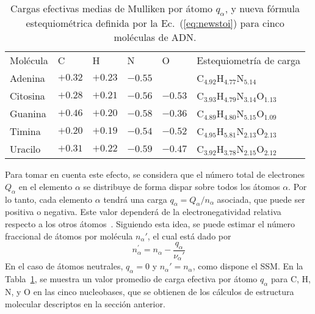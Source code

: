 \begin{table}
\begin{center}
\begin{tabular}{
>{\centering\arraybackslash}p{}
>{\centering\arraybackslash}p{}
>{\centering\arraybackslash}p{}
>{\centering\arraybackslash}p{}
>{\centering\arraybackslash}p{}
>{\centering\arraybackslash}p{}}
\rowcolor{mydarkgray} 
Molécula & C & H & N & O & Estequiometría de carga \\
Adenina  & $+0.32$ & $+0.23$ & $-0.55$ &       
         & C$_{4.92}$H$_{4.77}$N$_{5.14}$ \\ 
\rowcolor{mygray} 
Citosina & $+0.28$ & $+0.21$ & $-0.56$ & $-0.53$ 
         & C$_{3.93}$H$_{4.79}$N$_{3.14}$O$_{1.13}$ \\ 
Guanina  & $+0.46$ & $+0.20$ & $-0.58$ & $-0.36$ 
         & C$_{4.89}$H$_{4.80}$N$_{5.15}$O$_{1.09}$ \\ 
\rowcolor{mygray} 
Timina   & $+0.20$ & $+0.19$ & $-0.54$ & $-0.52$ 
         & C$_{4.95}$H$_{5.81}$N$_{2.13}$O$_{2.13}$ \\ 
Uracilo  & $+0.31$ & $+0.22$ & $-0.59$ & $-0.47$ 
         & C$_{3.92}$H$_{3.78}$N$_{2.15}$O$_{2.12}$ 
\end{tabular}
\caption[Cargas efectivas medias de Mulliken por átomo]
{Cargas efectivas medias de Mulliken por átomo $q_{\alpha}$, y nueva 
fórmula estequiométrica definida por la Ec.~(\ref{eq:newstoi}) para 
cinco moléculas de ADN.}
\label{tab:newstoi}
\end{center}
\end{table}

Para tomar en cuenta este efecto, se considera que el número total 
de electrones $Q_{\alpha }$ en el elemento $\alpha$ se distribuye de 
forma dispar sobre todos los átomos $\alpha$. Por lo tanto, cada 
elemento $\alpha$ tendrá una carga $q_{\alpha}=Q_{\alpha}/n_{\alpha}$ 
asociada, que puede ser positiva o negativa. Este valor dependerá de la 
electronegatividad relativa respecto a los otros 
átomos~\cite{rappe1991}. 
Siguiendo esta idea, se puede estimar el número fraccional de átomos por 
molécula $n_{\alpha}'$, el cual está dado por 
\begin{equation}
n_{\alpha }^{\prime }=n_{\alpha }-\frac{q_{\alpha }}{\nu_{\alpha }'}
\label{eq:newstoi}
\end{equation}
En el caso de átomos neutrales, $q_{\alpha}=0$ y 
$n_{\alpha}'=n_{\alpha}$, como dispone el SSM. En la 
Tabla~\ref{tab:newstoi}, se muestra un valor promedio de carga efectiva 
por átomo $q_{\alpha}$ para C, H, N, y O en las cinco nucleobases, que 
se obtienen de los cálculos de estructura molecular descriptos 
en la sección anterior.

